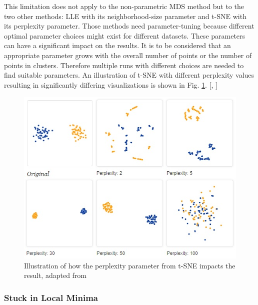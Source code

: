 This limitation does not apply to the non-parametric MDS method but to the two other methods: LLE with its neighborhood-size parameter and t-SNE with its perplexity parameter. Those methods need parameter-tuning because different optimal parameter choices might exist for different datasets. These parameters can have a significant impact on the results. It is to be considered that an appropriate parameter grows with the overall number of points or the number of points in clusters. Therefore multiple runs with different choices are needed to find suitable parameters. An illustration of t-SNE with different perplexity values resulting in significantly differing visualizations is shown in Fig. \ref{fig:parameter-tuning}. [\cite{t-SNE08}, \cite{how_t-SNE16}]
\begin{figure}[!]
	\centering
	\includegraphics[width=0.9\columnwidth]{images/parameter-tuning.jpg}
	\caption[Impact of Parameters]{Illustration of how the perplexity parameter from t-SNE impacts the result, adapted from \footnotemark}
    \label{fig:parameter-tuning}
\end{figure}

\subsubsection{Stuck in Local Minima}

